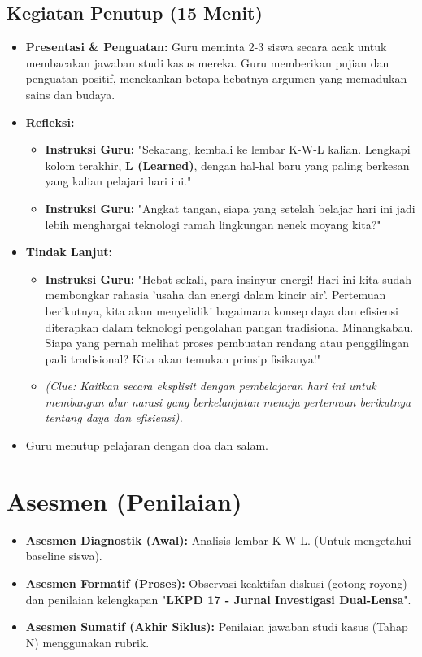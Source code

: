 \documentclass[12pt,a4paper]{article}
\begin{document}
\subsection{Kegiatan Penutup (15 Menit)}
\begin{itemize}
\item \textbf{Presentasi \& Penguatan:} Guru meminta 2-3 siswa secara acak untuk membacakan jawaban studi kasus mereka. Guru memberikan pujian dan penguatan positif, menekankan betapa hebatnya argumen yang memadukan sains dan budaya.
\item \textbf{Refleksi:}
    \begin{itemize}
    \item \textbf{Instruksi Guru:} "Sekarang, kembali ke lembar K-W-L kalian. Lengkapi kolom terakhir, \textbf{L (Learned)}, dengan hal-hal baru yang paling berkesan yang kalian pelajari hari ini."
    \item \textbf{Instruksi Guru:} "Angkat tangan, siapa yang setelah belajar hari ini jadi lebih menghargai teknologi ramah lingkungan nenek moyang kita?"
    \end{itemize}
\item \textbf{Tindak Lanjut:}
    \begin{itemize}
    \item \textbf{Instruksi Guru:} "Hebat sekali, para insinyur energi! Hari ini kita sudah membongkar rahasia 'usaha dan energi dalam kincir air'. Pertemuan berikutnya, kita akan menyelidiki bagaimana konsep daya dan efisiensi diterapkan dalam teknologi pengolahan pangan tradisional Minangkabau. Siapa yang pernah melihat proses pembuatan rendang atau penggilingan padi tradisional? Kita akan temukan prinsip fisikanya!"
    \item \textit{(Clue: Kaitkan secara eksplisit dengan pembelajaran hari ini untuk membangun alur narasi yang berkelanjutan menuju pertemuan berikutnya tentang daya dan efisiensi).}
    \end{itemize}
\item Guru menutup pelajaran dengan doa dan salam.
\end{itemize}

\section{Asesmen (Penilaian)}

\begin{itemize}
\item \textbf{Asesmen Diagnostik (Awal):} Analisis lembar K-W-L. (Untuk mengetahui baseline siswa).
\item \textbf{Asesmen Formatif (Proses):} Observasi keaktifan diskusi (gotong royong) dan penilaian kelengkapan "\textbf{LKPD 17 - Jurnal Investigasi Dual-Lensa}".
\item \textbf{Asesmen Sumatif (Akhir Siklus):} Penilaian jawaban studi kasus (Tahap N) menggunakan rubrik.
\end{itemize}
\end{document}
